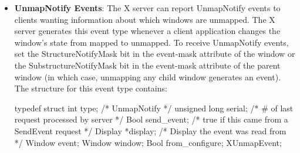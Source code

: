 \documentclass{report}
\begin{document}
\begin{itemize}
            \bigbreak \noindent 
            The structure for this event type contains:
            \bigbreak \noindent 
            \begin{cppcode}
            typedef struct {
                int type;                   /* MapNotify */
                unsigned long serial;       /* # of last request processed by server */
                Bool send_event;            /* true if this came from a SendEvent request */
                Display *display;           /* Display the event was read from */
                Window event;
                Window window;
                Bool override_redirect;     /* boolean, is override set... */
            } XMapEvent;
            \end{cppcode}
            \bigbreak \noindent 
            The event member is set either to the window that was mapped or to its parent, depending on whether StructureNotify or SubstructureNotify was selected. The window member is set to the window that was mapped. The override\_redirect member is set to the override-redirect attribute of the window. Window manager clients normally should ignore this window if the override-redirect attribute is True, because these events usually are generated from pop-ups, which override structure control
        \item \textbf{UnmapNotify Events}: The X server can report UnmapNotify events to clients wanting information about which windows are unmapped. The X server generates this event type whenever a client application changes the window’s state from mapped to unmapped.
            \bigbreak \noindent 
            To receive UnmapNotify events, set the StructureNotifyMask bit in the event-mask attribute of the window or the SubstructureNotifyMask bit in the event-mask attribute of the parent window (in which case, unmapping any child window generates an event).
            \bigbreak \noindent 
            The structure for this event type contains:
            \bigbreak \noindent 
            \begin{cppcode}
                typedef struct {
                    int type;               /* UnmapNotify */
                    unsigned long serial;   /* # of last request processed by server */
                    Bool send_event;        /* true if this came from a SendEvent request */
                    Display *display;       /* Display the event was read from */
                    Window event;
                    Window window;
                    Bool from_configure;
                } XUnmapEvent;

\end{cppcode}
\end{itemize}
\end{document}

